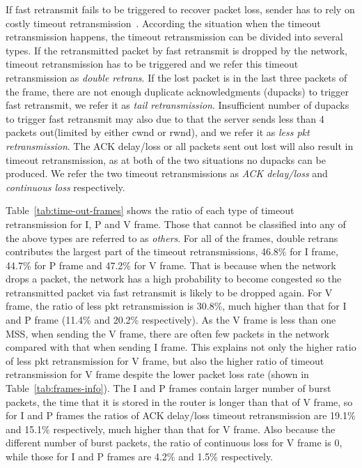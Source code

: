 If fast retransmit fails to be triggered to recover packet loss, sender has to rely on costly timeout retransmission~\cite{flach2013reducing}. According the situation when the timeout retransmission happens, the timeout retransmission can be divided into several types. If the retransmitted packet by fast retransmit is dropped by the network, timeout retransmission has to be triggered and we refer this timeout retransmission as \emph{double retrans}. If the lost packet is in the last three packets of the frame, there are not enough duplicate acknowledgments (dupacks) to trigger fast retransmit, we refer it as \emph{tail retransmission}. Insufficient number of dupacks to trigger fast retransmit may also due to that the server sends less than 4 packets out(limited by either cwnd or rwnd), and we refer it as \emph{less pkt retransmission}. The ACK delay/loss or all packets sent out lost will also result in timeout retransmission, as at both of the two situations no dupacks can be produced. We refer the two timeout retransmissions as \emph{ACK delay/loss} and \emph{continuous loss} respectively. 

Table~\ref{tab:time-out-frames} shows the ratio of each type of timeout retransmission for I, P and V frame. Those that cannot be classified into any of the above types are referred to as \emph{others}. For all of the frames, double retrans contributes the largest part of the timeout retransmissions, 46.8\% for I frame, 44.7\% for P frame and 47.2\% for V frame. That is because when the network drops a packet, the network has a high probability to become congested so the retransmitted packet via fast retransmit is likely to be dropped again. For V frame, the ratio of less pkt retransmission is 30.8\%, much higher than that for I and P frame (11.4\% and 20.2\% respectively). As the V frame is less than one MSS, when sending the V frame, there are often few packets in the network compared with that when sending I frame. This explains not only the higher ratio of less pkt retransmission for V frame, but also the higher ratio of timeout retransmission for V frame despite the lower packet loss rate (shown in Table~\ref{tab:frames-info}). The I and P frames contain larger number of burst packets, the time that it is stored in the router is longer than that of V frame, so for I and P frames the ratios of ACK delay/loss timeout retransmission are 19.1\% and 15.1\% respectively, much higher than that for V frame. Also because the different number of burst packets, the ratio of continuous loss for V frame is 0, while those for I and P frames are 4.2\% and 1.5\% respectively.

